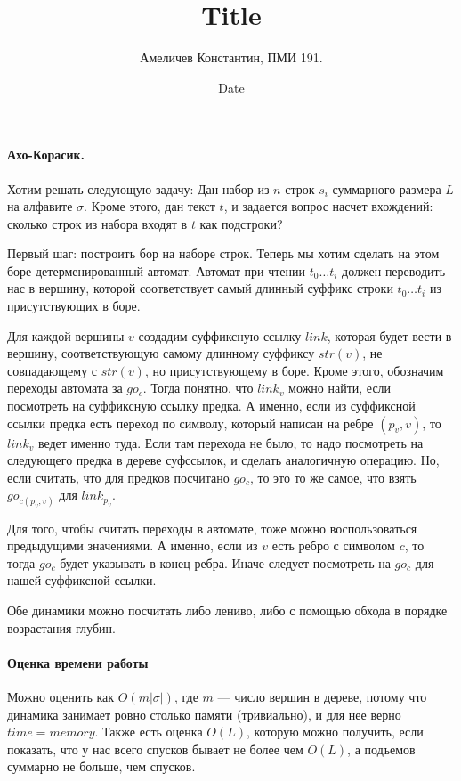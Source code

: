 \documentclass[12pt]{article}
\title{Title}
\author{Амеличев Константин, ПМИ 191.}
\date{Date}
\begin{document}
\paragraph{Ахо-Корасик.} Хотим решать следующую задачу: Дан набор из $n$ строк $s_i$ суммарного размера $L$ на алфавите $\sigma$. Кроме этого, дан текст $t$, и задается вопрос насчет вхождений: сколько строк из набора входят в $t$ как подстроки?

Первый шаг: построить бор на наборе строк. Теперь мы хотим сделать на этом боре детерменированный автомат. Автомат при чтении $t_{0}\ldots t_{i}$ должен переводить нас в вершину, которой соответствует самый длинный суффикс строки $t_{0}\ldots t_{i}$ из присутствующих в боре.

Для каждой вершины $v$ создадим суффиксную ссылку $link$, которая будет вести в вершину, соответствующую самому длинному суффиксу $str(v)$, не совпадающему с $str(v)$, но присутствующему в боре. Кроме этого, обозначим переходы автомата за $go_c$. Тогда понятно, что $link_v$ можно найти, если посмотреть на суффиксную ссылку предка. А именно, если из суффиксной ссылки предка есть переход по символу, который написан на ребре $(p_v, v)$, то $link_v$ ведет именно туда. Если там перехода не было, то надо посмотреть на следующего предка в дереве суфссылок, и сделать аналогичную операцию. Но, если считать, что для предков посчитано $go_c$, то это то же самое, что взять $go_{c(p_v, v)}$ для $link_{p_v}$.

Для того, чтобы считать переходы в автомате, тоже можно воспользоваться предыдущими значениями. А именно, если из $v$ есть ребро с символом $c$, то тогда $go_c$ будет указывать в конец ребра. Иначе следует посмотреть на $go_c$ для нашей суффиксной ссылки.

Обе динамики можно посчитать либо лениво, либо с помощью обхода в порядке возрастания глубин.

\paragraph{Оценка времени работы} Можно оценить как $O(m |\sigma|)$, где $m$ --- число вершин в дереве, потому что динамика занимает ровно столько памяти (тривиально), и для нее верно $time = memory$. Также есть оценка $O(L)$, которую можно получить, если показать, что у нас всего спусков бывает не более чем $O(L)$, а подъемов суммарно не больше, чем спусков.
\end{document}
